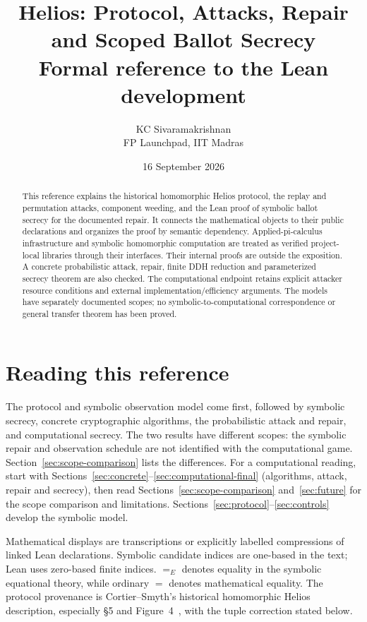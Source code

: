 \documentclass[11pt]{article}
\title{Helios: Protocol, Attacks, Repair\\and Scoped Ballot Secrecy\\[5pt]
  \large Formal reference to the Lean development}
\author{KC Sivaramakrishnan\\FP Launchpad, IIT Madras}
\date{16 September 2026}
\newcommand{\eqE}{\mathrel{=_{E}}}
\begin{document}
\maketitle
\begin{abstract}
This reference explains the historical homomorphic Helios protocol, the replay
and permutation attacks, component weeding, and the Lean proof of
symbolic ballot secrecy for the documented repair. It connects the mathematical
objects to their public declarations and organizes the proof by semantic
dependency. Applied-pi-calculus infrastructure and symbolic homomorphic
computation are treated as verified project-local libraries through their
interfaces. Their internal proofs are outside the exposition. A concrete
probabilistic attack, repair, finite DDH reduction and parameterized secrecy
theorem are also checked. The computational endpoint retains explicit attacker
resource conditions and external implementation/efficiency arguments. The models
have separately documented scopes; no symbolic-to-computational correspondence
or general transfer theorem has been proved.
\end{abstract}
{\setcounter{tocdepth}{1}\footnotesize\tableofcontents}


\section*{Reading this reference}
The protocol and symbolic observation model come first, followed by symbolic
secrecy, concrete cryptographic algorithms, the probabilistic attack and repair,
and computational secrecy. The two results have different scopes: the symbolic
repair and observation schedule are not identified with the computational game.
Section~\ref{sec:scope-comparison} lists the differences.
For a computational reading, start with Sections~\ref{sec:concrete}--\ref{sec:computational-final}
(algorithms, attack, repair and secrecy), then read
Sections~\ref{sec:scope-comparison} and~\ref{sec:future} for the scope comparison
and limitations. Sections~\ref{sec:protocol}--\ref{sec:controls} develop the symbolic model.

Mathematical displays are transcriptions or explicitly labelled compressions of
linked Lean declarations. Symbolic candidate indices are one-based in the text;
Lean uses zero-based finite indices. $\eqE$ denotes equality in the symbolic
equational theory, while ordinary $=$ denotes mathematical equality. The
protocol provenance is Cortier--Smyth's historical homomorphic Helios description,
especially \S5 and Figure~4~\cite{cs}, with the tuple correction stated below.
\end{document}

